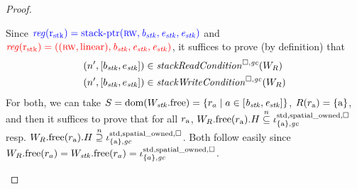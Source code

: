 \documentclass[a4paper]{article}
\begin{document}
\begin{proof}
\begin{itemize}
    Since $\src{\reg(\rstk) = \stkptr{\rw,\baddr_\stk,\eaddr_\stk,\eaddr_\stk}}$ and $\trg{\reg(\rstk) = ((\rw,\linear),\baddr_\stk,\eaddr_\stk,\eaddr_\stk)}$, it suffices to prove (by definition) that
    \begin{align*}
      \npair[n']{[b_\stk,e_\stk]} &\in \stackReadCond{W_R}\\
      \npair[n']{[b_\stk,e_\stk]} &\in \stackWriteCond{W_R}
    \end{align*}
    For both, we can take $S = \dom(\pwfree[W_\stk]) = \{r_a \mid a \in [\baddr_\stk,\eaddr_\stk]\}$, $R(r_\addr) = \{\addr\}$, and then it suffices to prove that for all $r_\addr$, $\pwfree[W_R](r_\addr).H \nsubeq \stdreg{\{\addr\},\gc}{\spatialo}$ resp. $\pwfree[W_R](r_\addr).H \nsupeq \stdreg{\{\addr\},\gc}{\spatialo}$.
    Both follow easily since 
    $\pwfree[W_R](r_a) = \pwfree[W_\stk](r_a) = \stdreg{\{a\},\gc}{\spatialo}$.
  \end{itemize}
\end{proof}
\end{document}
